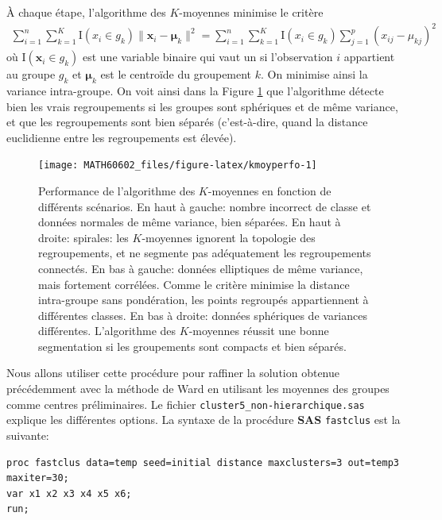 \documentclass[
  11pt,
  letterpaper,
]{book}
\theoremstyle{definition}
\theoremstyle{definition}
\theoremstyle{definition}
\theoremstyle{remark}
\begin{document}
À chaque étape, l'algorithme des \(K\)-moyennes minimise le critère
\begin{align*}
\sum_{i=1}^n \sum_{k=1}^K \mathrm{I}(x_i \in g_k)\|\boldsymbol{x}_i - \boldsymbol{\mu}_k\|^2 = \sum_{i=1}^n \sum_{k=1}^K \mathrm{I}(x_i \in g_k) \sum_{j=1}^p (x_{ij}-\mu_{kj})^2
\end{align*}
où \(\mathrm{I}(\boldsymbol{x}_i \in g_k)\) est une variable binaire qui vaut un si l'observation \(i\) appartient au groupe \(g_k\) et \(\boldsymbol{\mu}_k\) est le centroïde du groupement \(k\). On minimise ainsi la variance intra-groupe. On voit ainsi dans la Figure \ref{fig:kmoyperfo} que l'algorithme détecte bien les vrais regroupements si les groupes sont sphériques et de même variance, et que les regroupements sont bien séparés (c'est-à-dire, quand la distance euclidienne entre les regroupements est élevée).

\begin{figure}

{\centering \texttt{[image: MATH60602\_files/figure-latex/kmoyperfo-1]} 

}

\caption{Performance de l'algorithme des $K$-moyennes en fonction de différents scénarios. En haut à gauche: nombre incorrect de classe et données normales de même variance, bien séparées. En haut à droite: spirales: les $K$-moyennes ignorent la topologie des regroupements, et ne segmente pas adéquatement les regroupements connectés. En bas à gauche: données elliptiques de même variance, mais fortement corrélées. Comme le critère minimise la distance intra-groupe sans pondération, les points regroupés appartiennent à différentes classes. En bas à droite: données sphériques de variances différentes. L'algorithme des $K$-moyennes réussit une bonne segmentation si les groupements sont compacts et bien séparés.}\label{fig:kmoyperfo}
\end{figure}

Nous allons utiliser cette procédure pour raffiner la solution obtenue précédemment avec la méthode de Ward en utilisant les moyennes des groupes comme centres préliminaires. Le fichier \texttt{cluster5\_non-hierarchique.sas} explique les différentes options. La syntaxe de la procédure \textbf{SAS} \texttt{fastclus} est la suivante:

\begin{verbatim}
proc fastclus data=temp seed=initial distance maxclusters=3 out=temp3 maxiter=30;
var x1 x2 x3 x4 x5 x6;
run;
\end{verbatim}
\end{document}
